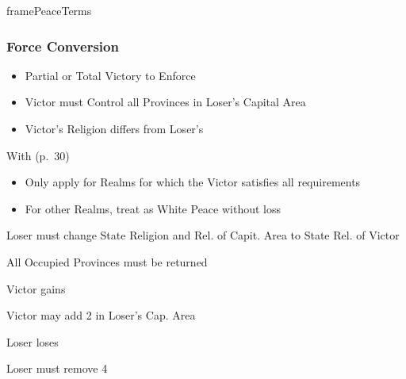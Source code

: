 \documentclass[10pt]{article}
\newlength{\fhPeaceTerms} \setlength\fhPeaceTerms{45.5\baselineskip}
\begin{document}
\begin{dynamiccontents*}{framePeaceTerms}
\begin{eubox}{\fhPeaceTerms}
\begin{multicols}{3}
		\subsubsection*{Force Conversion }
		\begin{itemize}
			{
				\color{peaceReqColor}
				\item {}
				\begin{itemize}
					\item Partial or Total Victory to Enforce
					\item Victor must Control all Provinces in Loser's Capital Area
					\item Victor's Religion differs from Loser's
				\end{itemize}
			}
			\item With  (p.~30)
			\begin{itemize}
				\item Only apply for Realms for which the Victor satisfies all requirements
				\item For other Realms, treat as White Peace without \prestige loss
			\end{itemize}
			\item Loser must change State Religion and Rel. of Capit. Area to State Rel. of Victor
			\item All Occupied Provinces must be returned
			\item Victor gains 
			\item Victor may add 2 \influence in Loser's Cap. Area
			\item Loser loses 
			\item Loser must remove 4 \influence
		\end{itemize}


\end{multicols}
\end{eubox}
\end{dynamiccontents*}
\end{document}
